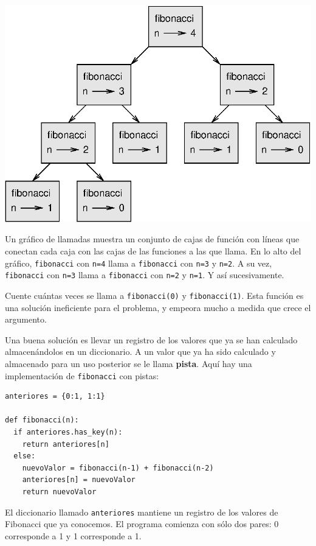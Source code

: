 \beforefig \centerline{\includegraphics{illustrations/fibonacci}}
\afterfig

Un gráfico de llamadas muestra un conjunto de cajas de función con
líneas que conectan cada caja con las cajas de las funciones a las
que llama. En lo alto del gráfico, \texttt{fibonacci} con \texttt{n=4}
llama a \texttt{fibonacci} con \texttt{n=3} y \texttt{n=2}. A su vez,
\texttt{fibonacci} con \texttt{n=3} llama a \texttt{fibonacci} con
\texttt{n=2} y \texttt{n=1}. Y así sucesivamente.

  

Cuente cuántas veces se llama a \texttt{fibonacci(0)} y \texttt{fibonacci(1)}.
Esta función es una solución ineficiente para el problema, y empeora
mucho a medida que crece el argumento.

Una buena solución es llevar un registro de los valores que ya se
han calculado almacenándolos en un diccionario. A un valor que ya
ha sido calculado y almacenado para un uso posterior se le llama \textbf{pista}.
Aquí hay una implementación de \texttt{fibonacci} con pistas:
\begin{lstlisting}
anteriores = {0:1, 1:1}

def fibonacci(n):
  if anteriores.has_key(n):
    return anteriores[n]
  else:
    nuevoValor = fibonacci(n-1) + fibonacci(n-2)
    anteriores[n] = nuevoValor
    return nuevoValor
\end{lstlisting}
El diccionario llamado \texttt{anteriores} mantiene un registro de
los valores de Fibonacci que ya conocemos. El programa comienza con
sólo dos pares: 0 corresponde a 1 y 1 corresponde a 1.

